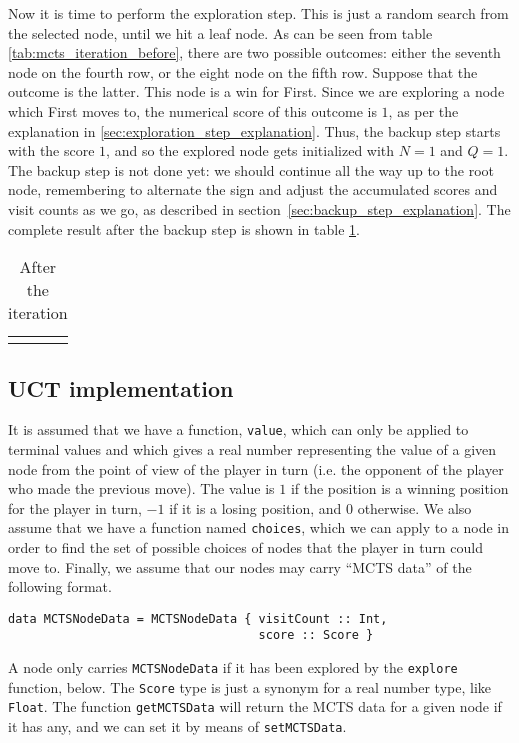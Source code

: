 Now it is time to perform the exploration step.
This is just a random search from the selected node, until we hit a leaf node.
As can be seen from table \ref{tab:mcts_iteration_before}, there are two possible outcomes: either the seventh node on the fourth row, or the eight node on the fifth row.
Suppose that the outcome is the latter.
This node is a win for First. Since we are exploring a node which First moves to, the numerical score of this outcome is $1$, as per the explanation in \ref{sec:exploration_step_explanation}.
Thus, the backup step starts with the score $1$, and so the explored node gets initialized with $N=1$ and $Q=1$.
The backup step is not done yet: we should continue all the way up to the root node, remembering to alternate the sign and adjust the accumulated scores and visit counts as we go, as described in section~\ref{sec:backup_step_explanation}.
The complete result after the backup step is shown in table \ref{fig:mcts_iteration_after}.
\begin{center}
\def\arraystretch{5.5}
\begin{table}
\begin{tabular}{l}
  \def\svgwidth{\columnwidth} 
\end{tabular}
\caption{After the iteration}
\label{fig:mcts_iteration_after}
\end{table}
\end{center}

\subsection{UCT implementation}

It is assumed that we have a function, \texttt{value}, which can only be applied to terminal values and which gives a real number representing the value of a given node from the point of view of the player in turn (i.e. the opponent of the player who made the previous move). The value is $1$ if the position is a winning position for the player in turn, $-1$ if it is a losing position, and $0$ otherwise.
We also assume that we have a function named \texttt{choices}, which we can apply to a node in order to find the set of possible choices of nodes that the player in turn could move to. Finally, we assume that our nodes may carry ``MCTS data'' of the following format.
\begin{lstlisting}[frame=single]
data MCTSNodeData = MCTSNodeData { visitCount :: Int,
                                   score :: Score }
\end{lstlisting}
A node only carries \texttt{MCTSNodeData} if it has been explored by the \texttt{explore} function, below.
The \texttt{Score} type is just a synonym for a real number type, like \texttt{Float}. The function \texttt{getMCTSData} will return the MCTS data for a given node if it has any, and we can set it by means of \texttt{setMCTSData}.

